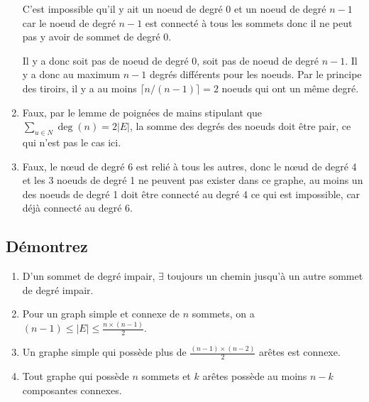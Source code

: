 \begin{solution}
\begin{enumerate}
      C'est impossible qu'il y ait un noeud de degré 0 et
      un noeud de degré $n-1$ car le noeud de degré $n-1$ est connecté
      à tous les sommets donc il ne peut pas y avoir de sommet de degré 0.

      Il y a donc soit pas de noeud de degré 0,
      soit pas de noeud de degré $n-1$.
      Il y a donc au maximum $n-1$ degrés différents pour les noeuds.
      Par le principe des tiroirs, il y a au moins
      $\lceil n / (n-1) \rceil = 2$ noeuds qui ont un même degré.
    \item Faux, par le lemme de poignées de mains stipulant que $\sum_{u \in N} \deg(n) = 2|E|$,
      la somme des degrés des noeuds doit être pair, ce qui n'est pas le cas ici.
    \item Faux, le nœud de degré 6 est relié à tous les autres,
      donc le nœud de degré 4 et les 3 noeuds de degré 1 ne peuvent pas exister dans ce graphe,
      au moins un des noeuds de degré 1 doit être connecté au degré 4 ce qui est impossible, car déjà connecté au degré 6.
  \end{enumerate}
\end{solution}

\subsection{Démontrez}
\begin{enumerate}
  \item D'un sommet de degré impair, $\exists$ toujours un chemin jusqu'à un autre sommet de degré impair.
  \item Pour un graph simple et connexe de $n$ sommets, on a $(n-1) \leq |E| \leq \frac{n \times (n-1)}{2}$.
  \item Un graphe simple qui possède plus de $\frac{(n-1) \times (n-2)}{2}$ arêtes est connexe.
  \item Tout graphe qui possède $n$ sommets et $k$ arêtes possède au moins $n-k$ composantes connexes.
\end{enumerate}

